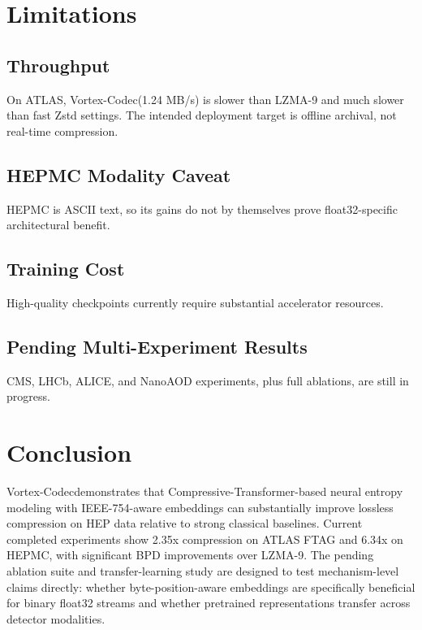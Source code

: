 \documentclass[10pt,twocolumn]{article}
\newcommand{\codec}{Vortex-Codec}
\begin{document}
\section{Limitations}
\subsection{Throughput}
On ATLAS, \codec (1.24 MB/s) is slower than LZMA-9 and much slower than fast Zstd settings. The intended deployment target is offline archival, not real-time compression.

\subsection{HEPMC Modality Caveat}
HEPMC is ASCII text, so its gains do not by themselves prove float32-specific architectural benefit.

\subsection{Training Cost}
High-quality checkpoints currently require substantial accelerator resources.

\subsection{Pending Multi-Experiment Results}
CMS, LHCb, ALICE, and NanoAOD experiments, plus full ablations, are still in progress.

\section{Conclusion}
\codec demonstrates that Compressive-Transformer-based neural entropy modeling with IEEE-754-aware embeddings can substantially improve lossless compression on HEP data relative to strong classical baselines. Current completed experiments show 2.35x compression on ATLAS FTAG and 6.34x on HEPMC, with significant BPD improvements over LZMA-9. The pending ablation suite and transfer-learning study are designed to test mechanism-level claims directly: whether byte-position-aware embeddings are specifically beneficial for binary float32 streams and whether pretrained representations transfer across detector modalities.
\end{document}
